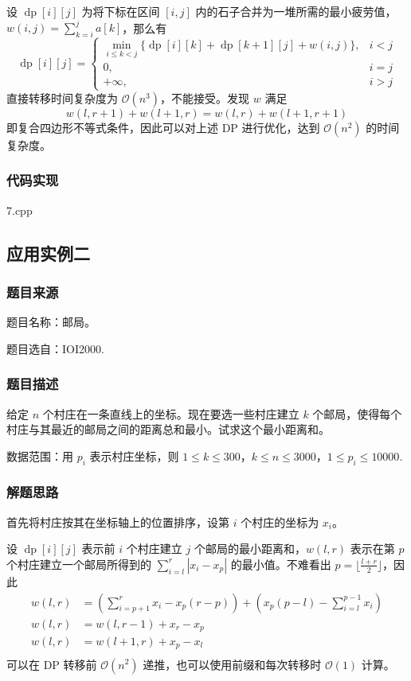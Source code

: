 \documentclass[a4paper, UTF8]{ctexart}
\begin{document}
设 \(\operatorname{dp}[i][j]\) 为将下标在区间 \([i,j]\)
内的石子合并为一堆所需的最小疲劳值，\(w(i,j)=\sum_{k=i}^ja[k]\)，那么有
\[
\operatorname{dp}[i][j]=
\left\{
\begin{array}{ll}
\min\limits_{i\le k < j}\{\operatorname{dp}[i][k]+\operatorname{dp}[k+1][j]+w(i,j)\},&i < j\\
0,&i=j\\
+\infty, &i>j
\end{array}
\right.
\] 直接转移时间复杂度为 \(\mathcal{O}(n^3)\)，不能接受。发现 \(w\) 满足
\[
w(l,r+1)+w(l+1,r)=w(l,r)+w(l+1,r+1)
\] 即复合四边形不等式条件，因此可以对上述 DP 进行优化，达到
\(\mathcal{O}(n^2)\) 的时间复杂度。

\subsubsection{代码实现}

7.cpp

\subsection{应用实例二}

\subsubsection{题目来源}

题目名称：邮局。

题目选自：IOI2000.

\subsubsection{题目描述}

给定 \(n\) 个村庄在一条直线上的坐标。现在要选一些村庄建立 \(k\)
个邮局，使得每个村庄与其最近的邮局之间的距离总和最小。试求这个最小距离和。

数据范围：用 \(p_i\) 表示村庄坐标，则
\(1\le k\le 300\)，\(k\le n\le 3000\)，\(1 \le p_i\le 10000\).

\subsubsection{解题思路}

首先将村庄按其在坐标轴上的位置排序，设第 \(i\) 个村庄的坐标为 \(x_i\)。

设 \(\operatorname{dp}[i][j]\) 表示前 \(i\) 个村庄建立 \(j\)
个邮局的最小距离和，\(w(l,r)\) 表示在第 \(p\) 个村庄建立一个邮局所得到的
\(\sum_{i=l}^r|x_i-x_p|\) 的最小值。不难看出
\(p=\lfloor \frac{l+r}{2}\rfloor\)，因此 \[
\begin{aligned}
w(l,r)&=(\sum_{i=p+1}^rx_i-x_p(r-p))+(x_p(p-l)-\sum_{i=l}^{p-1}x_i)\\
w(l,r)&=w(l,r-1)+x_r-x_p\\
w(l,r)&=w(l+1,r)+x_p-x_l\\
\end{aligned}
\] 可以在 DP 转移前 \(\mathcal{O}(n^2)\)
递推，也可以使用前缀和每次转移时 \(\mathcal{O}(1)\) 计算。
\end{document}
